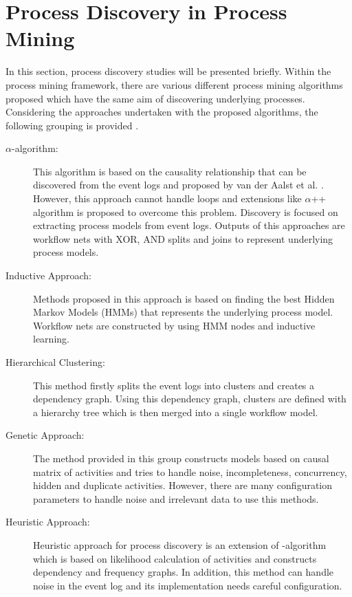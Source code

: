 \section{Process Discovery in Process Mining}
\label{sec:process-discovery-in-process-mining} 
In this section, process discovery studies will be presented briefly. Within the process mining framework, there are various different process mining algorithms proposed which have the same aim of discovering underlying processes. Considering the approaches undertaken with the proposed algorithms, the following grouping is provided \cite{khodabandelou2013process}.

\begin{description}
\item[$\alpha$-algorithm:] This algorithm is based on the causality relationship that can be discovered from the event logs and proposed by van der Aalst et al. \cite{van2004workflow}. However, this approach cannot handle loops and extensions like $\alpha$++ algorithm \cite{de2004process} is proposed to overcome this problem. Discovery is focused on extracting process models from event logs. Outputs of this approaches are workflow nets with XOR, AND splits and joins to represent underlying process models.
\item[Inductive Approach:] Methods proposed in this approach \cite{herbst1998integrating} \cite{herbst2000dealing} is based on finding the best Hidden Markov Models (HMMs) that represents the underlying process model. Workflow nets are constructed by using HMM nodes and inductive learning.
\item[Hierarchical Clustering:] This method \cite{greco2005mining} firstly splits the event logs into clusters and creates a dependency graph. Using this dependency graph, clusters are defined with a hierarchy tree which is then merged into a single workflow model.
\item[Genetic Approach:] The method provided in this group \cite{van2005genetic} constructs models based on causal matrix of activities and tries to handle noise, incompleteness, concurrency, hidden and duplicate activities. However, there are many configuration parameters to handle noise and irrelevant data to use this methods. 
\item[Heuristic Approach:]Heuristic approach for process discovery is an extension of \alpha-algorithm which is based on likelihood calculation of activities and constructs dependency and frequency graphs. In addition, this method can handle noise in the event log and its implementation needs careful configuration.
\end{description}
 
